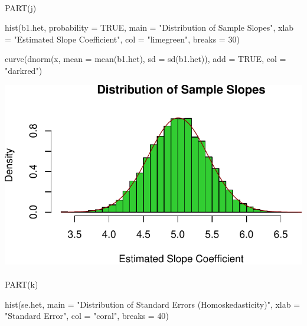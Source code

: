 \documentclass[
  11pt,
]{article}
\makeatletter
\let\oldparagraph\paragraph
\renewcommand{\paragraph}{
    \@ifstar
      \xxxParagraphStar
      \xxxParagraphNoStar
  }
\newcommand{\xxxParagraphStar}[1]{\oldparagraph*{#1}\mbox{}}
\newcommand{\xxxParagraphNoStar}[1]{\oldparagraph{#1}\mbox{}}
\newenvironment{Shaded}{\begin{snugshade}}{\end{snugshade}}
\newcommand{\AttributeTok}[1]{\textcolor[rgb]{0.40,0.45,0.13}{#1}}
\newcommand{\ConstantTok}[1]{\textcolor[rgb]{0.56,0.35,0.01}{#1}}
\newcommand{\DecValTok}[1]{\textcolor[rgb]{0.68,0.00,0.00}{#1}}
\newcommand{\FunctionTok}[1]{\textcolor[rgb]{0.28,0.35,0.67}{#1}}
\newcommand{\NormalTok}[1]{\textcolor[rgb]{0.00,0.23,0.31}{#1}}
\newcommand{\StringTok}[1]{\textcolor[rgb]{0.13,0.47,0.30}{#1}}
\makeatother
\begin{document}
\paragraph{PART(j)}\label{partj}

\begin{Shaded}
\begin{Highlighting}[]
\FunctionTok{hist}\NormalTok{(b1.het, }\AttributeTok{probability =} \ConstantTok{TRUE}\NormalTok{, }\AttributeTok{main =} \StringTok{"Distribution of Sample Slopes"}\NormalTok{, }
     \AttributeTok{xlab =} \StringTok{"Estimated Slope Coefficient"}\NormalTok{, }\AttributeTok{col =} \StringTok{"limegreen"}\NormalTok{, }\AttributeTok{breaks =} \DecValTok{30}\NormalTok{)}

\FunctionTok{curve}\NormalTok{(}\FunctionTok{dnorm}\NormalTok{(x, }\AttributeTok{mean =} \FunctionTok{mean}\NormalTok{(b1.het), }\AttributeTok{sd =} \FunctionTok{sd}\NormalTok{(b1.het)), }\AttributeTok{add =} \ConstantTok{TRUE}\NormalTok{, }\AttributeTok{col =} \StringTok{"darkred"}\NormalTok{)}
\end{Highlighting}
\end{Shaded}

\includegraphics{HW-4-CODE-and-ANSWERS_files/figure-pdf/unnamed-chunk-19-1.pdf}

\paragraph{PART(k)}\label{partk}

\begin{Shaded}
\begin{Highlighting}[]
\FunctionTok{hist}\NormalTok{(se.het, }
     \AttributeTok{main =} \StringTok{"Distribution of Standard Errors (Homoskedasticity)"}\NormalTok{, }
     \AttributeTok{xlab =} \StringTok{"Standard Error"}\NormalTok{, }\AttributeTok{col =} \StringTok{"coral"}\NormalTok{, }\AttributeTok{breaks =} \DecValTok{40}\NormalTok{)}
\end{Highlighting}
\end{Shaded}
\end{document}
